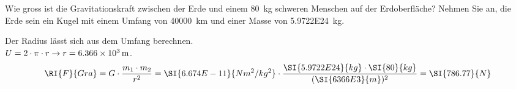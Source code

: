 
\begin{aufgabe}
	Wie gross ist die Gravitationskraft zwischen der Erde und einem \SI{80}{kg} schweren Menschen auf der Erdoberfläche?
	Nehmen Sie an, die Erde sein ein Kugel mit einem Umfang von \SI{40000}{km} und einer Masse von \SI{5.9722E24}{kg}.
	\begin{loesung}
		Der Radius lässt sich aus dem Umfang berechnen.\\
		$U=2\cdot\pi\cdot r \to r=\SI{6.366E3}{m}$.
		\begin{eqnarray*}
			\RI{F}{Gra} = G \cdot \frac{m_1 \cdot m_2}{r^2} = \SI{6.674E-11}{Nm^2/kg^2}\cdot\frac{\SI{5.9722E24}{kg}\cdot\SI{80}{kg}}{(\SI{6366E3}{m})^2}=\SI{786.77}{N}
		\end{eqnarray*}
	\end{loesung}
\end{aufgabe}
